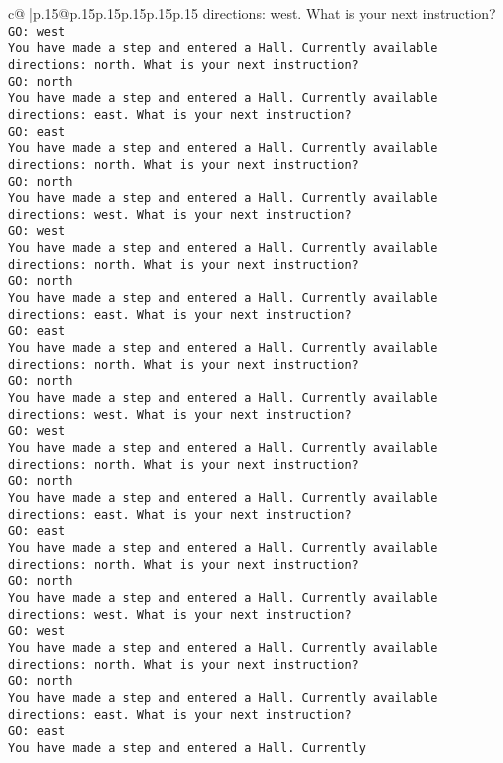 \documentclass{article}
\begin{document}
{\begin{supertabular}{c@{$\;$}|p{.15\linewidth}@{}p{.15\linewidth}p{.15\linewidth}p{.15\linewidth}p{.15\linewidth}p{.15\linewidth}}
{{{directions: west. What is your next instruction?\\ \tt GO: west\\ \tt You have made a step and entered a Hall. Currently available directions: north. What is your next instruction?\\ \tt GO: north\\ \tt You have made a step and entered a Hall. Currently available directions: east. What is your next instruction?\\ \tt GO: east\\ \tt You have made a step and entered a Hall. Currently available directions: north. What is your next instruction?\\ \tt GO: north\\ \tt You have made a step and entered a Hall. Currently available directions: west. What is your next instruction?\\ \tt GO: west\\ \tt You have made a step and entered a Hall. Currently available directions: north. What is your next instruction?\\ \tt GO: north\\ \tt You have made a step and entered a Hall. Currently available directions: east. What is your next instruction?\\ \tt GO: east\\ \tt You have made a step and entered a Hall. Currently available directions: north. What is your next instruction?\\ \tt GO: north\\ \tt You have made a step and entered a Hall. Currently available directions: west. What is your next instruction?\\ \tt GO: west\\ \tt You have made a step and entered a Hall. Currently available directions: north. What is your next instruction?\\ \tt GO: north\\ \tt You have made a step and entered a Hall. Currently available directions: east. What is your next instruction?\\ \tt GO: east\\ \tt You have made a step and entered a Hall. Currently available directions: north. What is your next instruction?\\ \tt GO: north\\ \tt You have made a step and entered a Hall. Currently available directions: west. What is your next instruction?\\ \tt GO: west\\ \tt You have made a step and entered a Hall. Currently available directions: north. What is your next instruction?\\ \tt GO: north\\ \tt You have made a step and entered a Hall. Currently available directions: east. What is your next instruction?\\ \tt GO: east\\ \tt You have made a step and entered a Hall. Currently }}}
\end{supertabular}}
\end{document}
